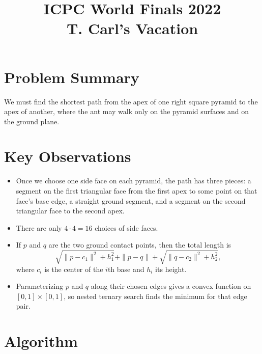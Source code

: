 \documentclass[11pt]{article}
\title{ICPC World Finals 2022\\T. Carl's Vacation}
\author{}
\date{}
\begin{document}
\maketitle

\section*{Problem Summary}

We must find the shortest path from the apex of one right square pyramid to the apex of another, where
the ant may walk only on the pyramid surfaces and on the ground plane.

\section*{Key Observations}

\begin{itemize}[leftmargin=*]
    \item Once we choose one side face on each pyramid, the path has three pieces: a segment on the first
    triangular face from the first apex to some point on that face's base edge, a straight ground segment,
    and a segment on the second triangular face to the second apex.
    \item There are only $4 \cdot 4 = 16$ choices of side faces.
    \item If $p$ and $q$ are the two ground contact points, then the total length is
    \[
    \sqrt{\|p-c_1\|^2+h_1^2}+\|p-q\|+\sqrt{\|q-c_2\|^2+h_2^2},
    \]
    where $c_i$ is the center of the $i$th base and $h_i$ its height.
    \item Parameterizing $p$ and $q$ along their chosen edges gives a convex function on
    $[0,1]\times[0,1]$, so nested ternary search finds the minimum for that edge pair.
\end{itemize}

\section*{Algorithm}
\end{document}
